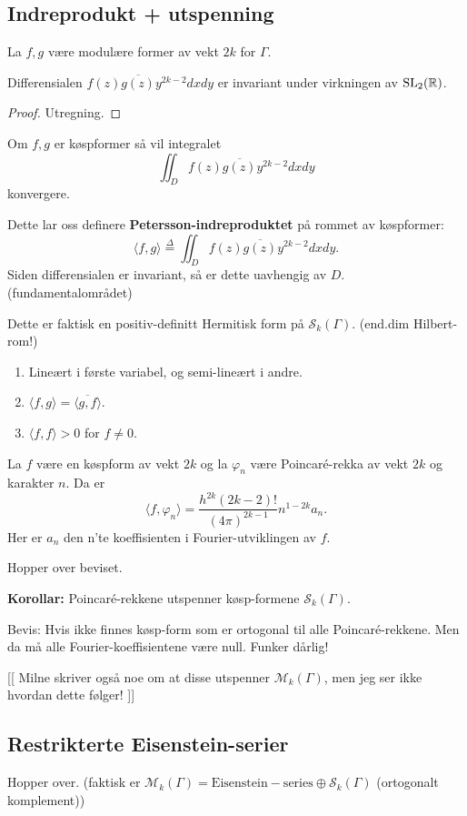 \documentclass[11pt, english]{article}
\begin{document}
\subsection{Indreprodukt + utspenning}

La $f,g$ være modulære former av vekt $2k$ for $\Gamma$.

\begin{lemma}
  Differensialen $f(z) \overline{g(z)} y^{2k-2} dx dy$ er invariant under virkningen av $\operatorname{SL}_2(\mathbb{R})$. 
\end{lemma}
\begin{proof}
 Utregning.
\end{proof}

Om $f,g$ er køspformer så vil integralet
\[
\iint_D f(z) \overline{g(z)} y^{2k-2} dx dy
\]
konvergere.

Dette lar oss definere \textbf{Petersson-indreproduktet} på rommet av køspformer:
\[
\langle f, g \rangle \stackrel{\Delta}{=} \iint_D f(z) \overline{g(z)} y^{2k-2} dx dy.
\]
Siden differensialen er invariant, så er dette uavhengig av $D$. (fundamentalområdet)

Dette er faktisk en positiv-definitt Hermitisk form på $\mathcal S_k(\Gamma)$. (end.dim Hilbert-rom!)
\begin{enumerate}
\item Lineært i første variabel, og semi-lineært i andre.
\item $\langle f, g \rangle = \overline{\langle g, f \rangle}$.
\item $\langle f, f \rangle > 0$ for $f \neq 0$.
\end{enumerate}

\begin{thm}
  La $f$ være en køspform av vekt $2k$ og la $\varphi_n$ være Poincaré-rekka av vekt $2k$ og karakter $n$. Da er 
\[
\langle f, \varphi_n \rangle = \frac{h^{2k} (2k-2)!}{(4\pi)^{2k-1}} n^{1-2k} a_n.
\]
Her er $a_n$ den n'te koeffisienten i Fourier-utviklingen av $f$.
\end{thm}
Hopper over beviset.

\textbf{Korollar:} Poincaré-rekkene utspenner køsp-formene $\mathcal S_k(\Gamma)$.

Bevis: Hvis ikke finnes køsp-form som er ortogonal til alle Poincaré-rekkene. Men da må alle Fourier-koeffisientene være null. Funker dårlig!

[[ Milne skriver også noe om at disse utspenner $\mathcal M_k(\Gamma)$, men jeg ser ikke hvordan dette følger! ]]
\subsection{Restrikterte Eisenstein-serier}

Hopper over. (faktisk er $\mathcal M_k(\Gamma) = \mathrm{Eisenstein-series} \oplus \mathcal S_k(\Gamma)$ (ortogonalt komplement))
\end{document}

